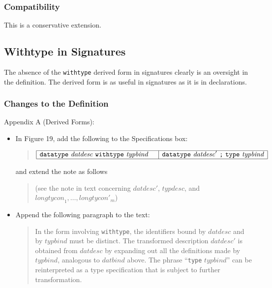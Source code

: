 \documentclass[twoside,titlepage]{article}
\begin{document}
\begin{appendix}
\subsubsection*{Compatibility}

This is a conservative extension.


\subsection{Withtype in Signatures}
\label{ext-withtype}

The absence of the {\tt withtype} derived form in signatures clearly is an oversight in the definition. The derived form is as useful in signatures as it is in declarations.

\subsubsection*{Changes to the Definition}

Appendix A (Derived Forms):
\begin{itemize}
\item In Figure 19, add the following to the Specifications box:
  \begin{quote}
  $\begin{array}{|l|l|}
  \hline
  {\tt{datatype}}~\mathit{datdesc}~{\tt{withtype}}~\mathit{typbind}~~~
  & {\tt{datatype}}~\mathit{datdesc}'~\mbox{\tt;}~{\tt{type}}~\mathit{typbind} \\
  \hline
  \end{array}$
  \end{quote}
  and extend the note as follows 
  \begin{quote}
  (see the note in text concerning $\mathit{datdesc}'$, $\mathit{typdesc}$, and $\mathit{longtycon}_1,\dots,\mathit{longtycon}'_m$) 
  \end{quote}

\item Append the following paragraph to the text:
  \begin{quote}
  In the form involving {\tt withtype}, the identifiers bound by $\mathit{datdesc}$ and by $\mathit{typbind}$ must be distinct. The transformed description $\mathit{datdesc}'$ is obtained from $\mathit{datdesc}$ by expanding out all the definitions made by $\mathit{typbind}$, analogous to $\mathit{datbind}$ above. The phrase ``{\tt type} $\mathit{typbind}$'' can be reinterpreted as a type specification that is subject to further transformation.
  \end{quote}
\end{itemize}


\end{appendix}
\end{document}
